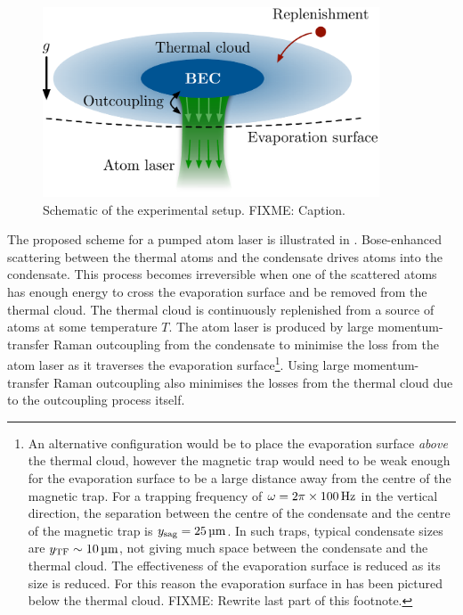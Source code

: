 \begin{figure}
    \centering
        \includegraphics[width=10cm]{QKTScheme}
    \caption{Schematic of the experimental setup. FIXME: Caption.}
    \label{KineticTheory:QKTScheme}
\end{figure}

The proposed scheme for a pumped atom laser is illustrated in . Bose-enhanced scattering between the thermal atoms and the condensate drives atoms into the condensate. This process becomes irreversible when one of the scattered atoms has enough energy to cross the evaporation surface and be removed from the thermal cloud. The thermal cloud is continuously replenished from a source of atoms at some temperature $T$. The atom laser is produced by large momentum-transfer Raman outcoupling from the condensate to minimise the loss from the atom laser as it traverses the evaporation surface\footnote{An alternative configuration would be to place the evaporation surface \emph{above} the thermal cloud, however the magnetic trap would need to be weak enough for the evaporation surface to be a large distance away from the centre of the magnetic trap. For a trapping frequency of $\omega = 2\pi \times \unit[100]{Hz}$ in the vertical direction, the separation between the centre of the condensate and the centre of the magnetic trap is $y_\text{sag} = \unit[25]{\micro m}$. In such traps, typical condensate sizes are $y_\text{TF} \sim \unit[10]{\micro m}$, not giving much space between the condensate and the thermal cloud. The effectiveness of the evaporation surface is reduced as its size is reduced. For this reason the evaporation surface in  has been pictured below the thermal cloud. FIXME: Rewrite last part of this footnote.}. Using large momentum-transfer Raman outcoupling also minimises the losses from the thermal cloud due to the outcoupling process itself.

